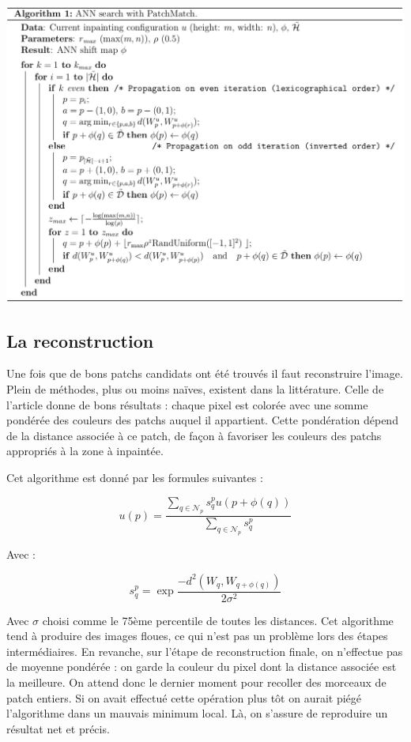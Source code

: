 \documentclass[a4paper, 10pt]{article}
\begin{document}
\begin{center}
\includegraphics[scale=0.26]{ANN.png} 
\end{center}
  
\subsection{La reconstruction}

Une fois que de bons patchs candidats ont été trouvés il faut reconstruire l'image. Plein de méthodes, plus ou moins naïves, existent dans la littérature. Celle de l'article donne de bons résultats : chaque pixel est colorée avec une somme pondérée des couleurs des patchs auquel il appartient. Cette pondération dépend de la distance associée à ce patch, de façon à favoriser les couleurs des patchs appropriés à la zone à inpaintée.  
  
Cet algorithme est donné par les formules suivantes :

$$u(p)=\frac{\sum_{q\in\mathcal{N}_p} s_q^pu(p+\phi(q))}{\sum_{q\in\mathcal{N}_p} s_q^p}$$

Avec :

$$s_q^p=\exp{\frac{-d^2(W_q,W_{q+\phi(q)})}{2\sigma^2}}$$

Avec $\sigma$ choisi comme le 75ème percentile de toutes les distances. Cet algorithme tend à produire des images floues, ce qui n'est pas un problème lors des étapes intermédiaires. En revanche, sur l'étape de reconstruction finale, on n'effectue pas de moyenne pondérée : on garde la couleur du pixel dont la distance associée est la meilleure. On attend donc le dernier moment pour recoller des morceaux de patch entiers. Si on avait effectué cette opération plus tôt on aurait piégé l'algorithme dans un mauvais minimum local. Là, on s'assure de reproduire un résultat net et précis.
\end{document}
